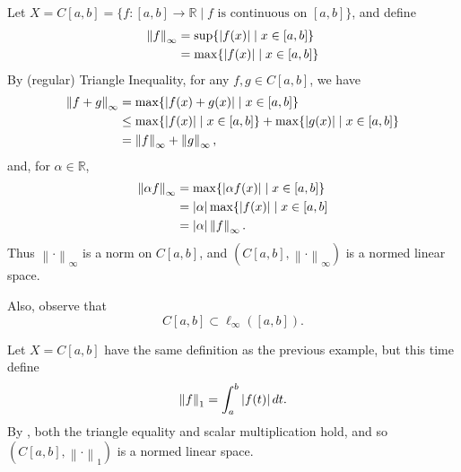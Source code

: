 \documentclass[notoc,notitlepage]{tufte-book}
\newcommand{\norm}[1]{\left\| #1 \right\|}
\begin{document}
\begin{eg}
  Let $X = C[a, b] = \{ f : [a, b] \to \mathbb{R} \mid f \text{ is continuous on } [a, b] \}$, and define
  \begin{align*}
    \norm{f}_\infty &= \sup \{ \abs{f(x)} \mid x \in [a, b] \} \\
                    &= \max \{ \abs{f(x)} \mid x \in [a, b] \}
  \end{align*}
  By (regular) Triangle Inequality, for any $f, g \in C[a, b]$, we have
  \begin{align*}
    \norm{f + g}_\infty &= \max \{ \abs{ f(x) + g(x) } \mid x \in [a, b] \} \\
                        &\leq \max \{ \abs{f(x)} \mid x \in [a, b] \} + \max \{ \abs{g(x)} \mid x \in [a, b] \} \\
                        &= \norm{f}_\infty + \norm{g}_\infty,
  \end{align*}
  and, for $\alpha \in \mathbb{R}$,
  \begin{align*}
    \norm{\alpha f}_\infty &= \max \{ \abs{ \alpha f(x) } \mid x \in [a, b] \} \\
                           &= \abs{\alpha} \max \{ \abs{f(x)} \mid x \in [a, b] \\
                           &= \abs{\alpha} \norm{f}_\infty.
  \end{align*}
  Thus $\norm\cdot_\infty$ is a norm on $C[a, b]$, and $( C[a, b], \norm\cdot_\infty )$ is a normed linear space.

  Also, observe that
  \begin{equation*}
    C[a, b] \subset \ell_\infty( [a, b] ).
  \end{equation*}
\end{eg}

\begin{eg}
  Let $X = C[a, b]$  have the same definition as the previous example, but this time define
  \begin{equation*}
    \norm{f}_1 = \int_{a}^{b} \abs{f(t)} \dif{t}.
  \end{equation*}
  By , both the triangle equality and scalar multiplication hold, and so $(C[a, b], \norm\cdot_1)$ is a normed linear space.
\end{eg}
\end{document}
